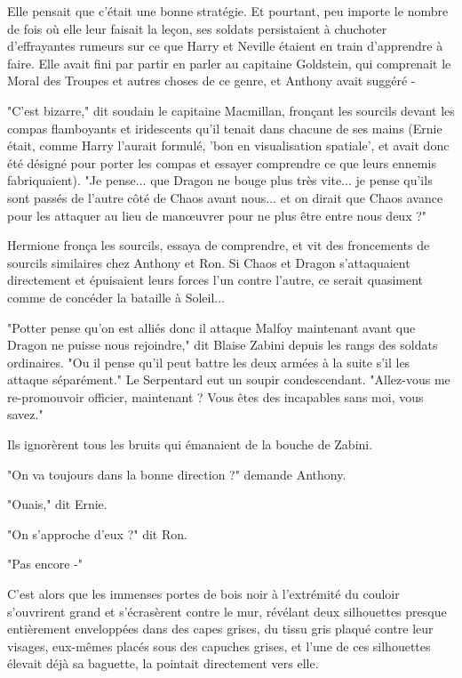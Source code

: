 Elle pensait que c'était une bonne stratégie. Et pourtant, peu importe le nombre de fois où elle leur faisait la leçon, ses soldats persistaient à chuchoter d'effrayantes rumeurs sur ce que Harry et Neville étaient en train d'apprendre à faire. Elle avait fini par partir en parler au capitaine Goldstein, qui comprenait le Moral des Troupes et autres choses de ce genre, et Anthony avait suggéré -

"C'est bizarre," dit soudain le capitaine Macmillan, fronçant les sourcils devant les compas flamboyants et iridescents qu'il tenait dans chacune de ses mains (Ernie était, comme Harry l'aurait formulé, 'bon en visualisation spatiale', et avait donc été désigné pour porter les compas et essayer comprendre ce que leurs ennemis fabriquaient). "Je pense... que Dragon ne bouge plus très vite... je pense qu'ils sont passés de l'autre côté de Chaos avant nous... et on dirait que Chaos avance pour les attaquer au lieu de manœuvrer pour ne plus être entre nous deux ?"

Hermione fronça les sourcils, essaya de comprendre, et vit des froncements de sourcils similaires chez Anthony et Ron. Si Chaos et Dragon s'attaquaient directement et épuisaient leurs forces l'un contre l'autre, ce serait quasiment comme de concéder la bataille à Soleil...

"Potter pense qu'on est alliés donc il attaque Malfoy maintenant avant que Dragon ne puisse nous rejoindre," dit Blaise Zabini depuis les rangs des soldats ordinaires. "Ou il pense qu'il peut battre les deux armées à la suite s'il les attaque séparément." Le Serpentard eut un soupir condescendant. "Allez-vous me re-promouvoir officier, maintenant ? Vous êtes des incapables sans moi, vous savez."

Ils ignorèrent tous les bruits qui émanaient de la bouche de Zabini.

"On va toujours dans la bonne direction ?" demande Anthony.

"Ouais," dit Ernie.

"On s'approche d'eux ?" dit Ron.

"Pas encore -"

C'est alors que les immenses portes de bois noir à l'extrémité du couloir s'ouvrirent grand et s'écrasèrent contre le mur, révélant deux silhouettes presque entièrement enveloppées dans des capes grises, du tissu gris plaqué contre leur visages, eux-mêmes placés sous des capuches grises, et l'une de ces silhouettes élevait déjà sa baguette, la pointait directement vers elle.

